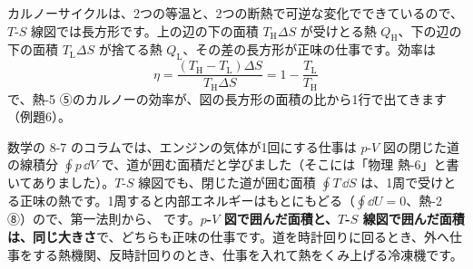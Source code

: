 カルノーサイクルは、2つの等温と、2つの断熱で可逆な変化でできているので、$T$-$S$ 線図では長方形です。上の辺の下の面積 $T_{\mathrm H}\Delta S$ が受けとる熱 $Q_{\mathrm H}$、下の辺の下の面積 $T_{\mathrm L}\Delta S$ が捨てる熱 $Q_{\mathrm L}$、その差の長方形が正味の仕事です。効率は
\[\eta=\frac{(T_{\mathrm H}-T_{\mathrm L})\Delta S}{T_{\mathrm H}\Delta S}=1-\frac{T_{\mathrm L}}{T_{\mathrm H}}\]
で、熱-5 ⑤のカルノーの効率が、図の長方形の面積の比から1行で出てきます（例題6）。

\label{ph:熱-6:menseki}数学の 8-7 のコラムでは、エンジンの気体が1回にする仕事は $p$-$V$ 図の閉じた道の線積分 $\oint p\,\dd V$ で、道が囲む面積だと学びました（そこには「物理 熱-6」と書いてありました）。$T$-$S$ 線図でも、閉じた道が囲む面積 $\oint T\,\dd S$ は、1周で受けとる正味の熱です。1周すると内部エネルギーはもとにもどる（$\oint\dd U=0$、熱-2 ⑧）ので、第一法則から、
です。\textbf{$p$-$V$ 図で囲んだ面積と、$T$-$S$ 線図で囲んだ面積は、同じ大きさ}で、どちらも正味の仕事です。道を時計回りに回るとき、外へ仕事をする熱機関、反時計回りのとき、仕事を入れて熱をくみ上げる冷凍機です。

